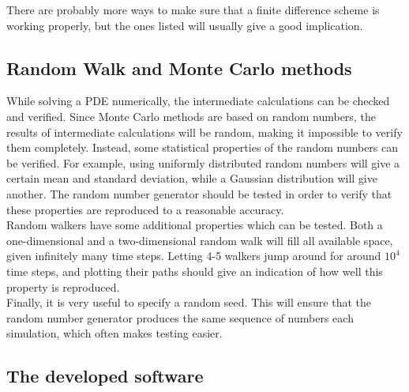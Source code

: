 \noindent There are probably more ways to make sure that a finite difference scheme is working properly, but the ones listed will usually give a good implication.

\subsection{Random Walk and Monte Carlo methods}

While solving a PDE numerically, the intermediate calculations can be checked and verified. 
Since Monte Carlo methods are based on random numbers, the results of intermediate calculations will be random, making it impossible to verify them completely. 
Instead, some statistical properties of the random numbers can be verified. 
For example, using uniformly distributed random numbers will give a certain mean and standard deviation, while a Gaussian distribution will give another.
The random number generator should be tested in order to verify that these properties are reproduced to a reasonable accuracy. \\

\noindent Random walkers have some additional properties which can be tested. 
Both a one-dimensional and a two-dimensional random walk will fill all available space, given infinitely many time steps. 
Letting 4-5 walkers jump around for around $10^4$ time steps, and plotting their paths should give an indication of how well this property is reproduced. \\

\noindent Finally, it is very useful to specify a random seed. This will ensure that the random number generator produces the same sequence of numbers each simulation, which often makes testing easier. 
 

\subsection{The developed software}


